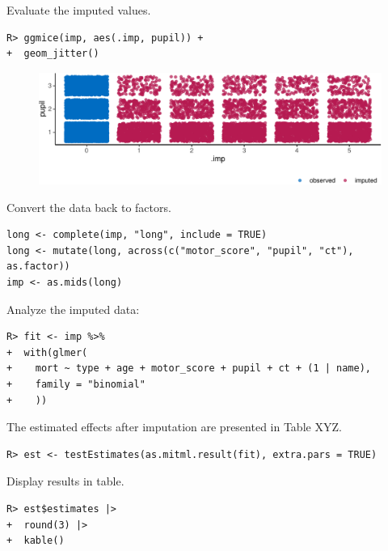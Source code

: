 \documentclass[
  article]{jss}
\begin{document}
Evaluate the imputed values.

\begin{verbatim}
R> ggmice(imp, aes(.imp, pupil)) +
+  geom_jitter()
\end{verbatim}

\begin{figure}[h]

{\centering \includegraphics{manuscript_files/figure-pdf/unnamed-chunk-40-1.pdf}

}

\end{figure}

Convert the data back to factors.

\begin{verbatim}
long <- complete(imp, "long", include = TRUE)
long <- mutate(long, across(c("motor_score", "pupil", "ct"), as.factor))
imp <- as.mids(long)
\end{verbatim}

Analyze the imputed data:

\begin{verbatim}
R> fit <- imp %>%
+  with(glmer(
+    mort ~ type + age + motor_score + pupil + ct + (1 | name),
+    family = "binomial"
+    ))
\end{verbatim}

The estimated effects after imputation are presented in Table XYZ.

\begin{verbatim}
R> est <- testEstimates(as.mitml.result(fit), extra.pars = TRUE)
\end{verbatim}

Display results in table.

\begin{verbatim}
R> est$estimates |> 
+  round(3) |>
+  kable()
\end{verbatim}
\end{document}
